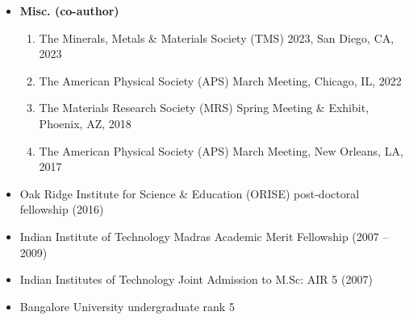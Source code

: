 \documentclass[10pt]{article}
\begin{document}
\begin{itemize}
\begin{enumerate}
        \end{enumerate}
    \item \textbf{Misc. (co-author)}
        \begin{enumerate}
            \item The Minerals, Metals \& Materials Society (TMS) 2023, San Diego, CA, 2023 \href{http://www.programmaster.org/PM/PM.nsf/ApprovedAbstracts/912AB7805FD2229985258880005D2130?OpenDocument}{}
            \item The American Physical Society (APS) March Meeting, Chicago, IL, 2022 \href{https://meetings.aps.org/Meeting/MAR22/Session/S31.2}{}
            \item The Materials Research Society (MRS) Spring Meeting \& Exhibit, Phoenix, AZ, 2018 \href{https://www.mrs.org/spring-2018-symposium-sessions-detail?code=CM03}{}
            \item The American Physical Society (APS) March Meeting, New Orleans, LA, 2017 \href{https://meetings.aps.org/Meeting/MAR17/Session/V12.6}{} \href{http://meetings.aps.org/link/BAPS.2017.MAR.G1.156}{}
        \end{enumerate}
\end{itemize} 

\begin{itemize}
    \item Oak Ridge Institute for Science \& Education (ORISE) post-doctoral fellowship (2016)
    \item Indian Institute of Technology Madras Academic Merit Fellowship (2007 -- 2009)
    \item Indian Institutes of Technology Joint Admission to M.Sc: AIR 5 (2007)
    \item Bangalore University undergraduate rank 5 
\end{itemize} 
\end{document}
